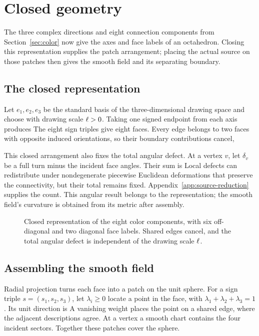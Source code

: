 \section{Closed geometry}
\label{sec:octahedron}
The three complex directions and eight connection components from Section~\ref{sec:color} now give the axes and face labels of an octahedron. Closing this representation supplies the patch arrangement; placing the actual source on those patches then gives the smooth field and its separating boundary.

\subsection{The closed representation}
Let $e_1,e_2,e_3$ be the standard basis of the three-dimensional drawing space and choose
\CurvatureSignedEndpointsDisplay
with drawing scale $\ell>0$. Taking one signed endpoint from each axis produces
\CurvatureOctahedralFacesDisplay
The eight sign triples give eight faces. Every edge belongs to two faces with opposite induced orientations, so their boundary contributions cancel,
\CurvatureClosedSurfaceDisplay

This closed arrangement also fixes the total angular defect. At a vertex $v$, let $\delta_v$ be a full turn minus the incident face angles. Their sum is
\CurvatureTotalDefectDisplay
Local defects can redistribute under nondegenerate piecewise Euclidean deformations that preserve the connectivity, but their total remains fixed. Appendix~\ref{app:source-reduction} supplies the count. This angular result belongs to the representation; the smooth field's curvature is obtained from its metric after assembly.

\begin{figure}[!htbp]
\centering
{}
\caption{Closed representation of the eight color components, with six off-diagonal and two diagonal face labels. Shared edges cancel, and the total angular defect is independent of the drawing scale $\ell$.}
\label{fig:complete}
\end{figure}
\FloatBarrier

\subsection{Assembling the smooth field}
Radial projection turns each face into a patch on the unit sphere. For a sign triple $s=(s_1,s_2,s_3)$, let $\lambda_i\ge0$ locate a point in the face, with $\lambda_1+\lambda_2+\lambda_3=1$. Its unit direction is
\ClosedPatchDirectionDisplay
A vanishing weight places the point on a shared edge, where the adjacent descriptions agree. At a vertex a smooth chart contains the four incident sectors. Together these patches cover the sphere.

